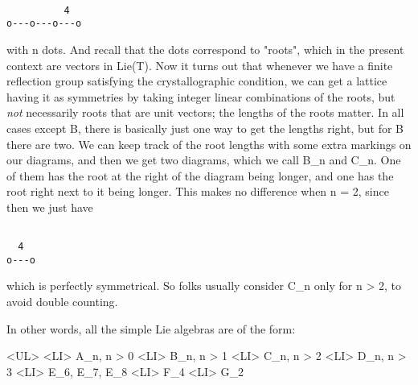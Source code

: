 \begin{verbatim}

          4
o---o---o---o
\end{verbatim}
    

with n dots.  And recall that the dots correspond to
"roots", which in the present context are vectors in Lie(T).
Now it turns out that whenever we have a finite reflection group
satisfying the crystallographic condition, we can get a lattice having
it as symmetries by taking integer linear combinations of the roots,
but \emph{not} necessarily roots that are unit vectors; the lengths
of the roots matter.  In all cases except B, there is basically just
one way to get the lengths right, but for B there are two.  We can
keep track of the root lengths with some extra markings on our
diagrams, and then we get two diagrams, which we call B_{n}
and C_{n}.  One of them has the root at the right of the
diagram being longer, and one has the root right next to it being
longer.  This makes no difference when n = 2, since then we just have


\begin{verbatim}

  4
o---o
\end{verbatim}
    

which is perfectly symmetrical.  So folks usually consider C_{n}
only for n > 2, to avoid double counting.  

In other words, all the simple Lie algebras are of the form:

<UL>
<LI>
A_{n}, n > 0
<LI>
B_{n}, n > 1
<LI>
C_{n}, n > 2
<LI>
D_{n}, n > 3
<LI>
E_{6}, E_{7}, E_{8}
<LI>
F_{4}
<LI>
G_{2}


